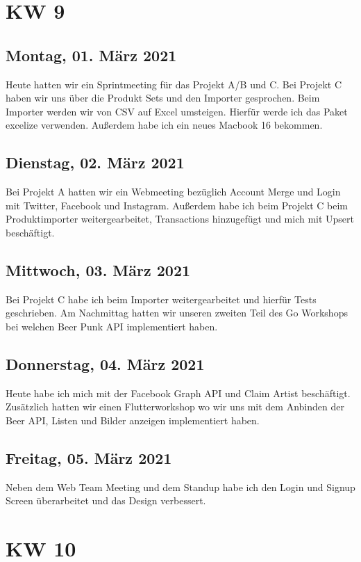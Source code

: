 \chapter{KW 9}

\section{Montag, 01. März 2021}
Heute hatten wir ein Sprintmeeting für das Projekt A/B und C. Bei Projekt C haben wir uns über die Produkt Sets und den Importer gesprochen. Beim Importer werden wir von CSV auf Excel umsteigen. Hierfür werde ich das Paket excelize\cite{excelize} verwenden. Außerdem habe ich ein neues Macbook 16 bekommen.

\section{Dienstag, 02. März 2021}
Bei Projekt A hatten wir ein Webmeeting bezüglich Account Merge und Login mit Twitter, Facebook und Instagram. Außerdem habe ich beim Projekt C beim Produktimporter weitergearbeitet, Transactions hinzugefügt und mich mit Upsert beschäftigt.

\section{Mittwoch, 03. März 2021}
Bei Projekt C habe ich beim Importer weitergearbeitet und hierfür Tests geschrieben. Am Nachmittag hatten wir unseren zweiten Teil des Go Workshops bei welchen Beer Punk API implementiert haben.

\section{Donnerstag, 04. März 2021}
Heute habe ich mich mit der Facebook Graph API und Claim Artist beschäftigt. Zusätzlich hatten wir einen Flutterworkshop wo wir uns mit dem Anbinden der Beer API, Listen und Bilder anzeigen implementiert haben.

\section{Freitag, 05. März 2021}
Neben dem Web Team Meeting und dem Standup habe ich den Login und Signup Screen überarbeitet und das Design verbessert.


\chapter{KW 10}

